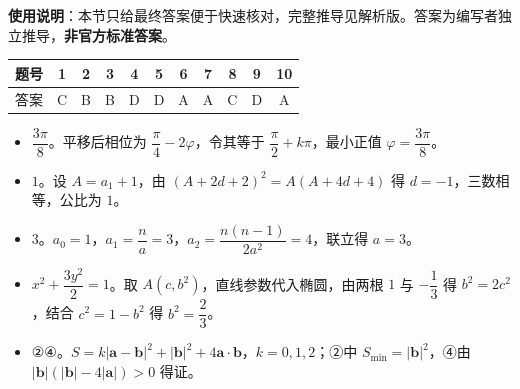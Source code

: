
\begin{gknotice}
\textbf{使用说明}：本节只给最终答案便于快速核对，完整推导见解析版。答案为编写者独立推导，\textbf{非官方标准答案}。
\end{gknotice}

\begin{center}\begin{tabular}{ccccccccccc}
\toprule
题号 & 1 & 2 & 3 & 4 & 5 & 6 & 7 & 8 & 9 & 10 \\
\midrule
答案 & C & B & B & D & D & A & A & C & D & A \\
\bottomrule
\end{tabular}\end{center}

\begin{itemize}[leftmargin=2.6em]
  \item[\textbf{11.}] $\dfrac{3\pi}8$。平移后相位为 $\dfrac\pi4-2\varphi$，令其等于 $\dfrac\pi2+k\pi$，最小正值 $\varphi=\dfrac{3\pi}8$。
  \item[\textbf{12.}] $1$。设 $A=a_1+1$，由 $(A+2d+2)^2=A(A+4d+4)$ 得 $d=-1$，三数相等，公比为 $1$。
  \item[\textbf{13.}] $3$。$a_0=1$，$a_1=\dfrac na=3$，$a_2=\dfrac{n(n-1)}{2a^2}=4$，联立得 $a=3$。
  \item[\textbf{14.}] $x^2+\dfrac{3y^2}{2}=1$。取 $A(c,b^2)$，直线参数代入椭圆，由两根 $1$ 与 $-\dfrac13$ 得 $b^2=2c^2$，结合 $c^2=1-b^2$ 得 $b^2=\dfrac23$。
  \item[\textbf{15.}] ②④。$S=k|\boldsymbol a-\boldsymbol b|^2+|\boldsymbol b|^2+4\boldsymbol a\cdot\boldsymbol b$，$k=0,1,2$；②中 $S_{\min}=|\boldsymbol b|^2$，④由 $|\boldsymbol b|(|\boldsymbol b|-4|\boldsymbol a|)>0$ 得证。
\end{itemize}

